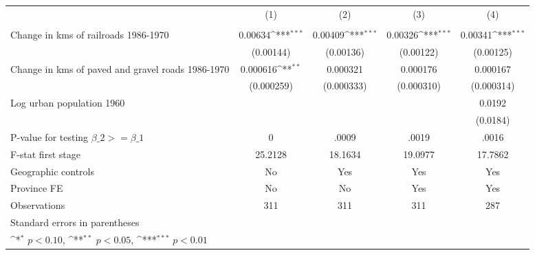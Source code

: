 {
\def\sym#1{\ifmmode^{#1}\else\(^{#1}\)\fi}
\begin{tabular}{l*{4}{c}}
\hline\hline
                &\multicolumn{1}{c}{(1)}&\multicolumn{1}{c}{(2)}&\multicolumn{1}{c}{(3)}&\multicolumn{1}{c}{(4)}\\
                &\multicolumn{1}{c}{}&\multicolumn{1}{c}{}&\multicolumn{1}{c}{}&\multicolumn{1}{c}{}\\
\hline
Change in kms of railroads 1986-1970&  0.00634\sym{***}&  0.00409\sym{***}&  0.00326\sym{***}&  0.00341\sym{***}\\
                &(0.00144)         &(0.00136)         &(0.00122)         &(0.00125)         \\
[1em]
Change in kms of paved and gravel roads 1986-1970& 0.000616\sym{**} & 0.000321         & 0.000176         & 0.000167         \\
                &(0.000259)         &(0.000333)         &(0.000310)         &(0.000314)         \\
[1em]
Log urban population 1960&                  &                  &                  &   0.0192         \\
                &                  &                  &                  & (0.0184)         \\
\hline
P-value for testing $\beta\_{2} >= \beta\_{1}$&        0         &    .0009         &    .0019         &    .0016         \\
F-stat first stage&  25.2128         &  18.1634         &  19.0977         &  17.7862         \\
Geographic controls&       No         &      Yes         &      Yes         &      Yes         \\
Province FE     &       No         &       No         &      Yes         &      Yes         \\
Observations    &      311         &      311         &      311         &      287         \\
\hline\hline
\multicolumn{5}{l}{\footnotesize Standard errors in parentheses}\\
\multicolumn{5}{l}{\footnotesize \sym{*} \(p<0.10\), \sym{**} \(p<0.05\), \sym{***} \(p<0.01\)}\\
\end{tabular}
}
